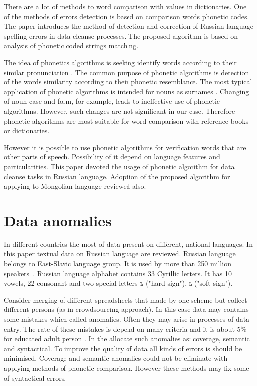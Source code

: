 \documentclass[conference,a4paper]{IEEEtran}
\begin{document}
There are a lot of methods to word comparison with values in dictionaries. One of the methods of errors detection is based on comparison words phonetic codes. The paper introduces the method of detection and correction of Russian language spelling errors in data cleanse processes. The proposed algorithm is based on analysis of phonetic coded strings matching.

The idea of phonetics algorithms is seeking identify words according to their similar pronunciation \cite{Parmar-2014}. The common purpose of phonetic algorithms is detection of the words similarity according to their phonetic resemblance. The most typical application of phonetic algorithms is intended for nouns as surnames \cite{Zahoransky-2015}. Changing of noun case and form, for example, leads to ineffective use of phonetic algorithms. However, such changes are not significant in our case. Therefore phonetic algorithms are most suitable for word comparison with reference books or dictionaries.

However it is possible to use phonetic algorithms for verification words that are other parts of speech. Possibility of it depend on language features and particularities. This paper devoted the usage of phonetic algorithm for data cleanse tasks in Russian language. Adoption of the proposed algorithm for applying to Mongolian language reviewed also.

\section{Data anomalies}
In different countries the most of data present on different, national languages. In this paper textual data on Russian language are reviewed. Russian language belongs to East-Slavic language group. It is used by more than 250 million speakers~\cite{Cubberley-2002}. Russian language alphabet contains 33 Cyrillic letters. It has 10 vowels, 22 consonant and two special letters ъ ("hard sign"), ь ("soft sign").

Consider merging of different spreadsheets that made by one scheme but collect different persons (as in crowdsourcing approach). 
In this case data may contains some mistakes which called anomalies. Often they may arise in processes of data entry. The rate of these mistakes is depend on many criteria and it is about 5\% for educated adult person \cite{Orr-1998}. In the \cite{Osipov-2002} allocate such anomalies as: coverage, semantic and syntactical. To improve the quality of data all kinds of errors is should be minimised. Coverage and semantic anomalies could not be eliminate with applying methods of phonetic comparison. However these methods may fix some of syntactical errors.
\end{document}
